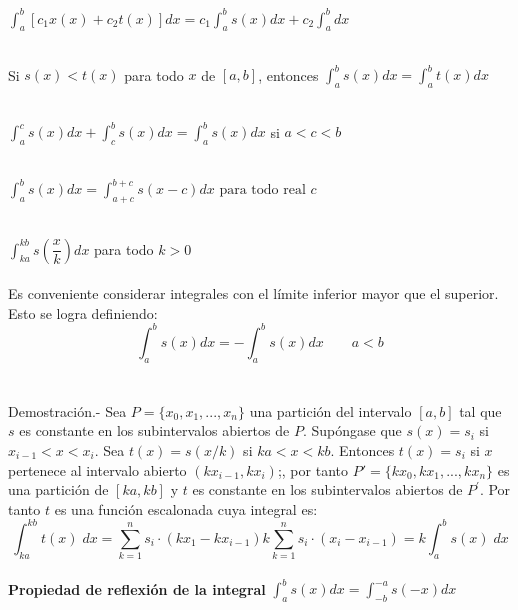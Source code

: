     \begin{teo}
	$\displaystyle\int_{a}^{b} [c_1x(x) + c_2t(x)] dx = c_1 \int_{a}^{b} s(x) dx + c_2 \int_{a}^{b} dx$\\\\
    \end{teo}

    \begin{teo} Si $s(x)<t(x)$ para todo $x$ de $[a,b]$, entonces $\displaystyle\int_{a}^{b} s(x) dx = \int_{a}^{b} t(x) dx$\\\\
    \end{teo}

    \begin{teo}
	$\displaystyle\int_{a}^{c} s(x) dx +  \int_{c}^{b} s(x) dx = \int_{a}^{b} s(x) dx$  si $a<c<b$ \\\\
    \end{teo}

    \begin{teo} 
	$\displaystyle\int_{a}^{b} s(x) dx = \int_{a+c}^{b+c} s(x-c) dx \mbox{ para todo real } c$\\\\
    \end{teo}

    \begin{teo}
	$\displaystyle\int_{ka}^{kb} s\left(\dfrac{x}{k}\right) dx$ para todo $k>0$\\\\
	Es conveniente considerar integrales con el límite inferior mayor que el superior. Esto se logra definiendo: $$\displaystyle\int_{a}^{b} s(x) dx = - \int_{a}^{b} s(x) dx \qquad a<b$$\\\\
	    Demostración.-\; Sea $P=\lbrace x_0,x_1,...,x_n \rbrace$ una partición del intervalo $[a,b]$ tal que $s$ es constante en los subintervalos abiertos de $P$. Supóngase que $s(x)=s_i$ si $x_{i-1}<x<x_i$. Sea $t(x)=s(x/k)$ si $ka<x<kb$. Entonces $t(x)=s_i$ si $x$ pertenece al intervalo abierto $(kx_{i-1},kx_i)$;, por tanto $P{'}=\lbrace kx_0,kx_1,...,kx_n \rbrace$ es una partición de $[ka,kb]$ y $t$ es constante en los subintervalos abiertos de $P^{'}$. Por tanto $t$ es una función escalonada cuya integral es: $$\displaystyle\int_{ka}^{kb} t(x) \; dx = \sum\limits_{k=1}^{n} s_i \cdot (kx_1 - kx_{i-1}) k\sum\limits_{k=1}^n s_i \cdot (x_i - x_{i-1}) = k \int_{a}^{b} s(x) \; dx$$\\
    \textbf{Propiedad de reflexión de la integral}
	$\displaystyle\int_{a}^{b} s(x) dx = \int_{-b}^{-a} s(-x) dx$\\\\
    \end{teo}

